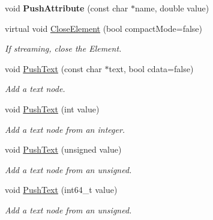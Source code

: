 \begin{DoxyCompactItemize}
void {\bfseries Push\+Attribute} (const char $\ast$name, double value)
\item 
\mbox{\label{classtinyxml2_1_1XMLPrinter_ad04d29562b46fcdb23ab320f8b664240}} 
virtual void \mbox{\hyperlink{classtinyxml2_1_1XMLPrinter_ad04d29562b46fcdb23ab320f8b664240}{Close\+Element}} (bool compact\+Mode=false)
\begin{DoxyCompactList}\small\item\em If streaming, close the Element. \end{DoxyCompactList}\item 
\mbox{\label{classtinyxml2_1_1XMLPrinter_a1cc16a9362df4332012cb13cff6441b3}} 
void \mbox{\hyperlink{classtinyxml2_1_1XMLPrinter_a1cc16a9362df4332012cb13cff6441b3}{Push\+Text}} (const char $\ast$text, bool cdata=false)
\begin{DoxyCompactList}\small\item\em Add a text node. \end{DoxyCompactList}\item 
\mbox{\label{classtinyxml2_1_1XMLPrinter_a3e0d4d78de25d4cf081009e1431cea7e}} 
void \mbox{\hyperlink{classtinyxml2_1_1XMLPrinter_a3e0d4d78de25d4cf081009e1431cea7e}{Push\+Text}} (int value)
\begin{DoxyCompactList}\small\item\em Add a text node from an integer. \end{DoxyCompactList}\item 
\mbox{\label{classtinyxml2_1_1XMLPrinter_a661fb50e7e0a4918d2d259cb0fae647e}} 
void \mbox{\hyperlink{classtinyxml2_1_1XMLPrinter_a661fb50e7e0a4918d2d259cb0fae647e}{Push\+Text}} (unsigned value)
\begin{DoxyCompactList}\small\item\em Add a text node from an unsigned. \end{DoxyCompactList}\item 
\mbox{\label{classtinyxml2_1_1XMLPrinter_a96b0a0bfe105154a0a6c37d725258f0a}} 
void \mbox{\hyperlink{classtinyxml2_1_1XMLPrinter_a96b0a0bfe105154a0a6c37d725258f0a}{Push\+Text}} (int64\+\_\+t value)
\begin{DoxyCompactList}\small\item\em Add a text node from an unsigned. \end{DoxyCompactList}\item 

\end{DoxyCompactItemize}
